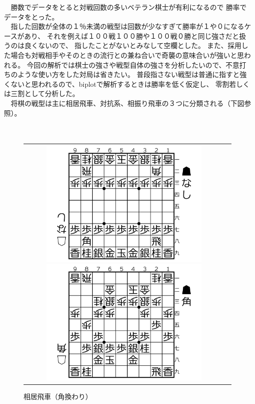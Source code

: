 \documentclass[11pt,a4paper,dvipdfmx]{jsarticle}
\begin{document}
　勝数でデータをとると対戦回数の多いベテラン棋士が有利になるので
勝率でデータをとった。
\\
　指した回数が全体の１％未満の戦型は回数が少なすぎて勝率が１や０になるケースがあり、
それを例えば１００戦１００勝や１００戦０勝と同じ強さだと扱うのは良くないので、
指したことがないとみなして空欄とした。
また、採用した場合も対戦相手やそのときの流行との兼ね合いで奇襲の意味合いが強いと思われる。
今回の解析では棋士の強さや戦型自体の強さを分析したいので、不意打ちのような使い方をした対局は省きたい。
普段指さない戦型は普通に指すと強くないと思われるので、biplotで解析するときは勝率を低く仮定し、
零割若しくは三割として分析した。
\\
　将棋の戦型は主に相居飛車、対抗系、相振り飛車の３つに分類される（下図参照）。
\\
\\
\\
\begin{figure}[h]
    \begin{tabular}{cc}
        \begin{minipage}[t]{0.47\hsize}
            \centering
            \includegraphics[width=0.8\textwidth]{graph/shoki.png}
            \caption{初期配置}
        \end{minipage}
        \begin{minipage}[t]{0.47\hsize}
            \centering
            \includegraphics[width=0.8\textwidth]{graph/kk.png}
            \caption{相居飛車（角換わり）}
        \end{minipage}
    \end{tabular}
\end{figure}
\end{document}
